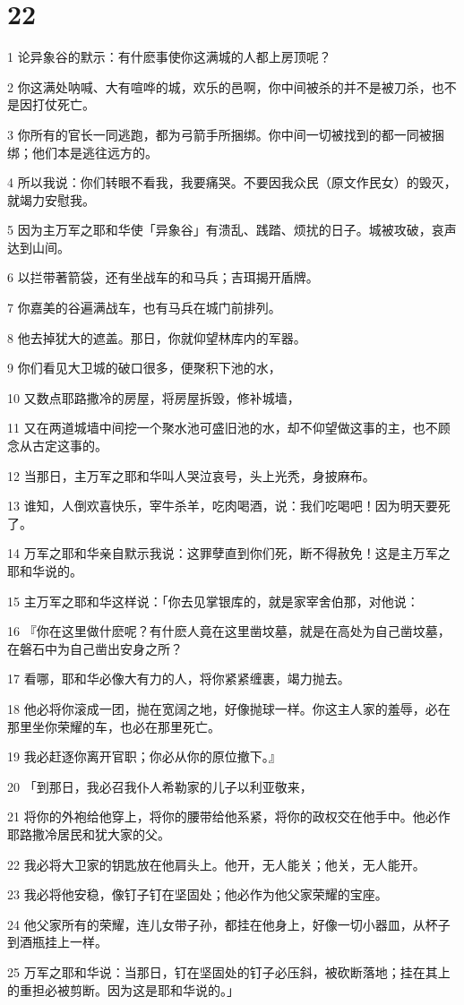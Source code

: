 \chapter{22}

\par 1 论异象谷的默示：有什麽事使你这满城的人都上房顶呢？
\par 2 你这满处呐喊、大有喧哗的城，欢乐的邑啊，你中间被杀的并不是被刀杀，也不是因打仗死亡。
\par 3 你所有的官长一同逃跑，都为弓箭手所捆绑。你中间一切被找到的都一同被捆绑；他们本是逃往远方的。
\par 4 所以我说：你们转眼不看我，我要痛哭。不要因我众民（原文作民女）的毁灭，就竭力安慰我。
\par 5 因为主万军之耶和华使「异象谷」有溃乱、践踏、烦扰的日子。城被攻破，哀声达到山间。
\par 6 以拦带著箭袋，还有坐战车的和马兵；吉珥揭开盾牌。
\par 7 你嘉美的谷遍满战车，也有马兵在城门前排列。
\par 8 他去掉犹大的遮盖。那日，你就仰望林库内的军器。
\par 9 你们看见大卫城的破口很多，便聚积下池的水，
\par 10 又数点耶路撒冷的房屋，将房屋拆毁，修补城墙，
\par 11 又在两道城墙中间挖一个聚水池可盛旧池的水，却不仰望做这事的主，也不顾念从古定这事的。
\par 12 当那日，主万军之耶和华叫人哭泣哀号，头上光秃，身披麻布。
\par 13 谁知，人倒欢喜快乐，宰牛杀羊，吃肉喝酒，说：我们吃喝吧！因为明天要死了。
\par 14 万军之耶和华亲自默示我说：这罪孽直到你们死，断不得赦免！这是主万军之耶和华说的。
\par 15 主万军之耶和华这样说：「你去见掌银库的，就是家宰舍伯那，对他说：
\par 16 『你在这里做什麽呢？有什麽人竟在这里凿坟墓，就是在高处为自己凿坟墓，在磐石中为自己凿出安身之所？
\par 17 看哪，耶和华必像大有力的人，将你紧紧缠裹，竭力抛去。
\par 18 他必将你滚成一团，抛在宽阔之地，好像抛球一样。你这主人家的羞辱，必在那里坐你荣耀的车，也必在那里死亡。
\par 19 我必赶逐你离开官职；你必从你的原位撤下。』
\par 20 「到那日，我必召我仆人希勒家的儿子以利亚敬来，
\par 21 将你的外袍给他穿上，将你的腰带给他系紧，将你的政权交在他手中。他必作耶路撒冷居民和犹大家的父。
\par 22 我必将大卫家的钥匙放在他肩头上。他开，无人能关；他关，无人能开。
\par 23 我必将他安稳，像钉子钉在坚固处；他必作为他父家荣耀的宝座。
\par 24 他父家所有的荣耀，连儿女带子孙，都挂在他身上，好像一切小器皿，从杯子到酒瓶挂上一样。
\par 25 万军之耶和华说：当那日，钉在坚固处的钉子必压斜，被砍断落地；挂在其上的重担必被剪断。因为这是耶和华说的。」

